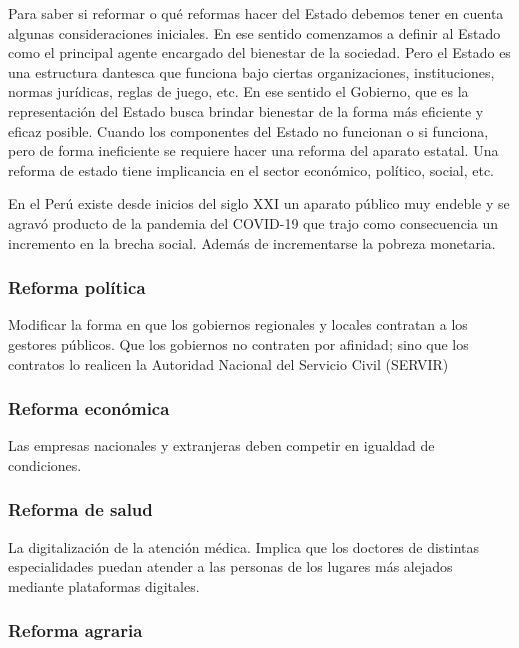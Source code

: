 \documentclass[
  a4paper,
]{article}
\begin{document}
Para saber si reformar o qué reformas hacer del Estado debemos tener en
cuenta algunas consideraciones iniciales. En ese sentido comenzamos a
definir al Estado como el principal agente encargado del bienestar de la
sociedad. Pero el Estado es una estructura dantesca que funciona bajo
ciertas organizaciones, instituciones, normas jurídicas, reglas de
juego, etc. En ese sentido el Gobierno, que es la representación del
Estado busca brindar bienestar de la forma más eficiente y eficaz
posible. Cuando los componentes del Estado no funcionan o si funciona,
pero de forma ineficiente se requiere hacer una reforma del aparato
estatal. Una reforma de estado tiene implicancia en el sector económico,
político, social, etc.

En el Perú existe desde inicios del siglo XXI un aparato público muy
endeble y se agravó producto de la pandemia del COVID-19 que trajo como
consecuencia un incremento en la brecha social. Además de incrementarse
la pobreza monetaria.

\hypertarget{reforma-poluxedtica}{%
\subsubsection{Reforma política}\label{reforma-poluxedtica}}

Modificar la forma en que los gobiernos regionales y locales contratan a
los gestores públicos. Que los gobiernos no contraten por afinidad; sino
que los contratos lo realicen la Autoridad Nacional del Servicio Civil
(SERVIR)

\hypertarget{reforma-econuxf3mica}{%
\subsubsection{Reforma económica}\label{reforma-econuxf3mica}}

Las empresas nacionales y extranjeras deben competir en igualdad de
condiciones.

\hypertarget{reforma-de-salud}{%
\subsubsection{Reforma de salud}\label{reforma-de-salud}}

La digitalización de la atención médica. Implica que los doctores de
distintas especialidades puedan atender a las personas de los lugares
más alejados mediante plataformas digitales.

\hypertarget{reforma-agraria}{%
\subsubsection{Reforma agraria}\label{reforma-agraria}}
\end{document}
